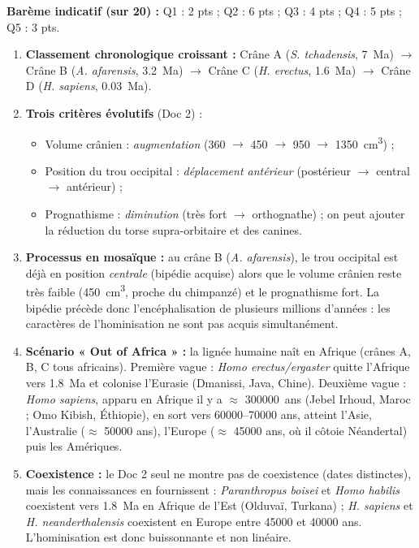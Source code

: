 \documentclass[11pt]{article}
\newcommand{\cle}[1]{{\popxbold\color{popdark}#1}}
\begin{document}
\begin{corrige}
\textbf{Barème indicatif (sur 20) :} Q1 : 2 pts ; Q2 : 6 pts ; Q3 : 4 pts ; Q4 : 5 pts ; Q5 : 3 pts.
\begin{enumerate}
    \item \textbf{Classement chronologique croissant :} Crâne A (\emph{S. tchadensis}, \SI{7}{Ma}) $\rightarrow$ Crâne B (\emph{A. afarensis}, \SI{3,2}{Ma}) $\rightarrow$ Crâne C (\emph{H. erectus}, \SI{1,6}{Ma}) $\rightarrow$ Crâne D (\emph{H. sapiens}, \SI{0,03}{Ma}).
    \item \textbf{Trois critères évolutifs} (Doc 2) :
    \begin{itemize}
        \item Volume crânien : \emph{augmentation} (360 $\rightarrow$ 450 $\rightarrow$ 950 $\rightarrow$ \SI{1350}{cm^3}) ;
        \item Position du trou occipital : \emph{déplacement antérieur} (postérieur $\rightarrow$ central $\rightarrow$ antérieur) ;
        \item Prognathisme : \emph{diminution} (très fort $\rightarrow$ orthognathe) ; on peut ajouter la réduction du torse supra-orbitaire et des canines.
    \end{itemize}
    \item \textbf{Processus en mosaïque :} au crâne B (\emph{A. afarensis}), le trou occipital est déjà en position \emph{centrale} (bipédie acquise) alors que le volume crânien reste très faible (\SI{450}{cm^3}, proche du chimpanzé) et le prognathisme fort. La bipédie précède donc l'encéphalisation de plusieurs millions d'années : les caractères de l'hominisation ne sont pas acquis simultanément.
    \item \textbf{Scénario « Out of Africa » :} la lignée humaine naît en Afrique (crânes A, B, C tous africains). Première vague : \emph{Homo erectus/ergaster} quitte l'Afrique vers \SI{1,8}{Ma} et colonise l'Eurasie (Dmanissi, Java, Chine). Deuxième vague : \emph{Homo sapiens}, apparu en Afrique il y a $\approx$ \SI{300000}{ans} (Jebel Irhoud, Maroc ; Omo Kibish, Éthiopie), en sort vers \num{60000}--\num{70000} ans, atteint l'Asie, l'Australie ($\approx$ \num{50000} ans), l'Europe ($\approx$ \num{45000} ans, où il côtoie Néandertal) puis les Amériques.
    \item \textbf{Coexistence :} le Doc 2 seul ne montre pas de coexistence (dates distinctes), mais les connaissances en fournissent : \emph{Paranthropus boisei} et \emph{Homo habilis} coexistent vers \SI{1,8}{Ma} en Afrique de l'Est (Olduvaï, Turkana) ; \emph{H. sapiens} et \emph{H. neanderthalensis} coexistent en Europe entre \num{45000} et \num{40000} ans. L'hominisation est donc \cle{buissonnante} et non linéaire.
\end{enumerate}
\end{corrige}
\end{document}
